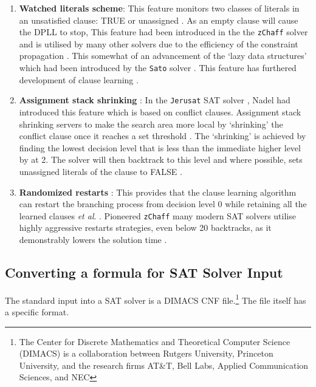 \documentclass[11pt, a4paper, oneside]{report} %
\begin{document}
\begin{enumerate}
  \item \textbf{Watched literals scheme}:  This feature monitors two classes of
literals in an unsatisfied clause: TRUE or unassigned \cite{moskewicz2001chaff}.
As an empty clause will cause the DPLL to stop, This feature had been introduced
in the the \texttt{zChaff} solver and is utilised by many other solvers due to
the efficiency of the constraint propagation \cite{gomes2008satisfiability}.
This somewhat of an advancement of the `lazy data structures' which had been
introduced by the \texttt{Sato} solver \cite{zhang1997sato}. This feature has
furthered development of clause learning
\cite{zhang2002quest,gomes2008satisfiability}.


  \item \textbf{Assignment stack shrinking} : In the \texttt{Jerusat} SAT solver
\cite{nadel2002jerusat}, Nadel had introduced this feature which is based on
conflict clauses. Assignment stack shrinking servers to make the search area
more local by `shrinking' the conflict clause once it reaches a set threshold
\cite{Nadel:2010:ASS:2164073.2164111}. The `shrinking' is achieved by finding
the lowest decision level that is less than the immediate higher level by at 2.
The solver will then backtrack to this level and where possible, sets unassigned
literals of the clause to FALSE \cite{Nadel:2010:ASS:2164073.2164111}.


  \item \textbf{Randomized restarts} : This provides that the clause learning
algorithm can restart   the branching process from decision level 0 while
retaining all the learned clauses \textit{et   al}. \cite{gomes1998boosting}.
Pioneered \texttt{zChaff} \cite{moskewicz2001chaff} many modern   SAT solvers
utilise highly aggressive restarts strategies, even below 20 backtracks, as it
demonstrably lowers the solution time \cite{gomes2008satisfiability}.

\end{enumerate}

\subsection{Converting a formula for SAT Solver Input}

The standard input into a SAT solver is a DIMACS CNF file.\footnote{The Center
for Discrete Mathematics and Theoretical Computer Science (DIMACS) is a
collaboration between Rutgers University, Princeton University, and the research
firms AT&T, Bell Labs, Applied Communication Sciences, and NEC} The file itself
has a specific format. 
\end{document}
